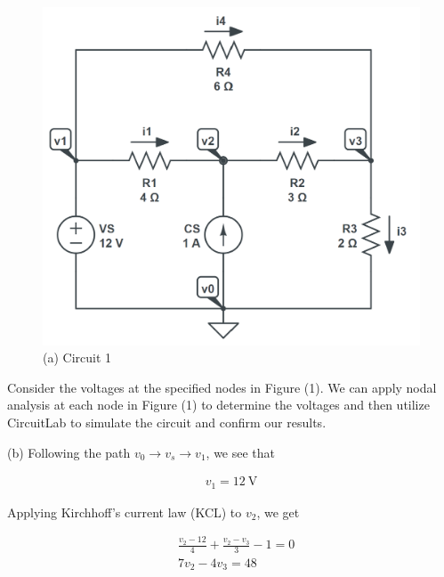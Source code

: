 \documentclass[12pt]{article}
\begin{document}
\begin{figure}[H]
    \begin{center}
        \includegraphics[scale=0.6]{circuit-1.png}
        \caption { (a) Circuit 1}
    \end{center}
\end{figure}

Consider the voltages at the specified nodes in Figure (1). We can apply nodal analysis at each node in Figure (1) to determine the voltages and then utilize CircuitLab to simulate the circuit and confirm our results.

(b) Following the path $ v_0 \rightarrow v_s \rightarrow v_1$, we see that 

\begin{equation}
    \begin{split}
        v_1 = \SI{12}{\volt}
    \end{split}
\end{equation}

\pagebreak

Applying Kirchhoff's current law (KCL) to $v_2$, we get

\begin{equation}
    \begin{split}
        &\frac{v_2 - 12}{4} + \frac{v_2 - v_3}{3} - 1 = 0 \\ 
        &7v_2 - 4v_3 = 48
    \end{split}
\end{equation}
\end{document}
